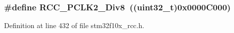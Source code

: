 \subsubsection[{\texorpdfstring{R\+C\+C\+\_\+\+P\+C\+L\+K2\+\_\+\+Div8}{RCC_PCLK2_Div8}}]{\setlength{\rightskip}{0pt plus 5cm}\#define R\+C\+C\+\_\+\+P\+C\+L\+K2\+\_\+\+Div8~(({\bf uint32\+\_\+t})0x0000\+C000)}\hypertarget{group___a_d_c__clock__source_ga77d5c803e2d31a806467bb7db9d24cd0}{}\label{group___a_d_c__clock__source_ga77d5c803e2d31a806467bb7db9d24cd0}


Definition at line 432 of file stm32f10x\+\_\+rcc.\+h.

